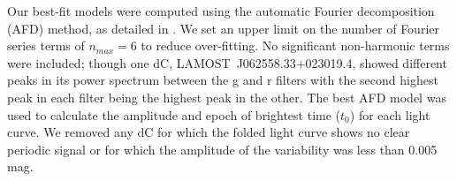 \documentclass[twocolumn]{aastex631}
\begin{document}
% 



% 


 Our best-fit models were computed using the automatic Fourier decomposition (AFD) method, as detailed in \citet{Torrealba2015}. We set an upper limit on the number of Fourier series terms of $n_{max} = 6$ to reduce over-fitting. No significant non-harmonic terms were included; though one dC, LAMOST~J062558.33+023019.4, showed different peaks in its power spectrum between the g and r filters with the second highest peak in each filter being the highest peak in the other. The best AFD model was used to calculate the amplitude and epoch of brightest time ($t_0$) for each light curve.  We removed any dC for which the folded light curve shows no clear periodic signal or for which the amplitude of the variability was less than 0.005\,mag. 



\end{document}
